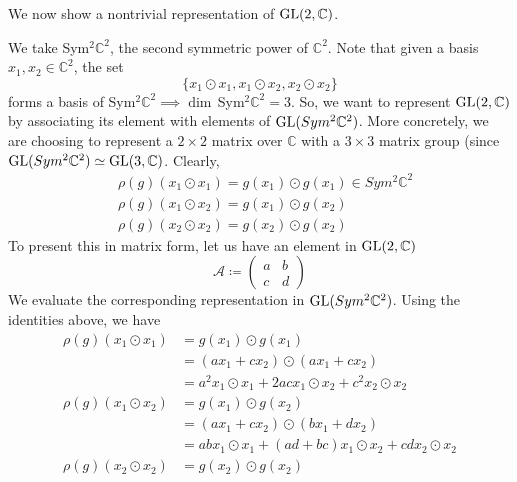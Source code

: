   We now show a nontrivial representation of $\operatorname{GL}(2, \mathbb{C})$. 

  \begin{example}
    \label{ex:the-second-symmetric-power-sym2c2}
    We take Sym$^2 \mathbb{C}^2$, the second symmetric power of $\mathbb{C}^2$. Note that given a basis $x_1, x_2 \in \mathbb{C}^2$, the set
    \begin{equation}
      \{x_1 \odot x_1, x_1 \odot x_2, x_2 \odot x_2\}
    \end{equation}
    forms a basis of Sym$^2 \mathbb{C}^2 \implies \dim\,$Sym$^2 \mathbb{C}^2 = 3$. So, we want to represent $\operatorname{GL}(2, \mathbb{C})$ by associating its element with elements of $\operatorname{GL}(Sym^2 \mathbb{C}^2)$. More concretely, we are choosing to represent a $2 \times 2$ matrix over $\mathbb{C}$ with a $3 \times 3$ matrix group (since $\operatorname{GL}(Sym^2 \mathbb{C}^2) \simeq \operatorname{GL}(3, \mathbb{C})$. Clearly,
    \begin{align*}
      & \rho(g) (x_1 \odot x_1) = g(x_1) \odot g(x_1) \in Sym^2 \mathbb{C}^2 \\
      & \rho(g) (x_1 \odot x_2) = g(x_1) \odot g(x_2) \\
      & \rho(g) (x_2 \odot x_2) = g(x_2) \odot g(x_2)
    \end{align*}
    To present this in matrix form, let us have an element in $\operatorname{GL} (2, \mathbb{C})$
    \begin{equation}
      \mathcal{A} \coloneqq \begin{pmatrix}
      a & b \\
      c & d
      \end{pmatrix}
    \end{equation}
    We evaluate the corresponding representation in $\operatorname{GL}( Sym^2 \mathbb{C}^2)$. Using the identities above, we have 
    \begin{align*}
      \rho(g) (x_1 \odot x_1) & = g(x_1) \odot g(x_1) \\
      & = (a x_1 + c x_2) \odot (a x_1 + c x_2) \\
      & = a^2 x_1 \odot x_1 + 2ac x_1 \odot x_2 + c^2 x_2 \odot x_2 \\
      \rho(g) (x_1 \odot x_2) & = g(x_1) \odot g(x_2) \\
      & = (a x_1 + c x_2) \odot (b x_1 + d x_2) \\
      & = ab x_1 \odot x_1 + (ad + bc) x_1 \odot x_2 + cd x_2 \odot x_2 \\
      \rho(g) (x_2 \odot x_2) & = g(x_2) \odot g(x_2) \\

\end{align*}
\end{example}
